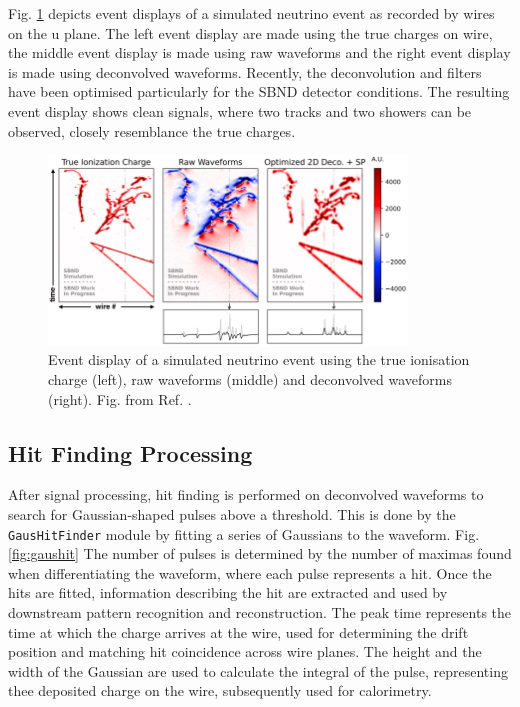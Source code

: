 Fig. \ref{fig:signal_processing_waveform} depicts event displays of a simulated neutrino event as recorded by wires on the u plane.
The left event display are made using the true charges on wire, the middle event display is made using raw waveforms and the right event display is made using deconvolved waveforms.
Recently, the deconvolution and filters have been optimised particularly for the SBND detector conditions.
The resulting event display shows clean signals, where two tracks and two showers can be observed, closely resemblance the true charges. 

\begin{figure}[htbp!] 
\centering    
\includegraphics[width=0.85\textwidth]{signal_processing_waveform}
\caption[signal_processing_waveform]{
Event display of a simulated neutrino event using the true ionisation charge (left), raw waveforms (middle) and deconvolved waveforms (right).
Fig. from Ref. \cite{}.
}
\label{fig:signal_processing_waveform}
\end{figure}

\subsection{Hit Finding Processing}
After signal processing, hit finding is performed on deconvolved waveforms to search for Gaussian-shaped pulses above a threshold.
This is done by the \texttt{GausHitFinder} module \cite{gaushitfinder} by fitting a series of Gaussians to the waveform.
Fig. \ref{fig:gaushit} 
The number of pulses is determined by the number of maximas found when differentiating the waveform, where each pulse represents a hit.
Once the hits are fitted, information describing the hit are extracted and used by downstream pattern recognition and reconstruction.
The peak time represents the time at which the charge arrives at the wire, used for determining the drift position and matching hit coincidence across wire planes.
The height and the width of the Gaussian are used to calculate the integral of the pulse, representing thee deposited charge on the wire, subsequently used for calorimetry.

